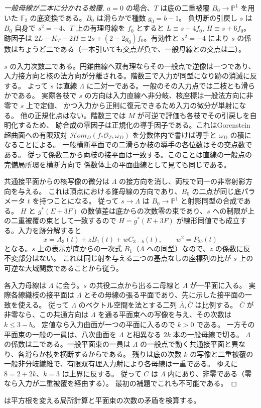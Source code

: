 \begin{proof}[一般母線が二本に分かれる被覆]
$a=0$ の場合、$T$ は底の二重被覆 $B_0\to\mathbb P^1$ を用いた
$\mathbb F_2$ の底変換である。$B_0$ は滑らかで種数 $g_0=b-1$。
負切断の引戻し $s$ は $B_0$ 自身で $s^2=-4$、$T$ 上の有理母線を $f_0$ とすると
$L\equiv s+4f_0$, $H\equiv s+6f_0$。
跡因子は $2L-K_T-2H\equiv2s+(2-2g_0)f_0$。有効性と $s^2=-4$ により
$s$ の係数はちょうど二である（一本引いても交点が負で、一般母線との交点は二）。

$s$ の入力次数二である。円錐曲線へ双有理ならその一般点で逆像は一つであり、
入力接方向と核の法方向が分離される。階数三で入力が同型になり跡の消滅に反する。
よって $s$ は直線 $\Lambda$ に二対一である。一般のその入力点では二枝とも滑らかである。
実際各枝で $s$ の方向は入力直線へ非分岐、核座標は一般法方向に非零で $s$ 上で定値、
かつ入力から正則に復元できるため入力の微分が単射になる。
他の正規化点はない。階数三では $M$ が可逆で評価も各枝でその引戻しを自明化するため、
跡合成の零因子は正規化の導手因子である。これはGorenstein超曲面への有限双対
$\mathcal Hom_D(f_*\mathcal O_T,\omega_D)$ を分数体内で書けば導手と $\omega_D$ の積になることによる。
一般横断平面での二滑らか枝の導手の各位数はその交点数である。
従って係数二から両枝の接平面は一致する。このことは直線の一般点の完備局所環を横断方向で
係数体上の平面曲線として見ても同じである。

共通接平面からの核写像の微分は $\Lambda$ の接方向を消し、両枝で同一の非零射影方向を与える。
これは頂点における錐母線の方向であり、$B_0$ の二点が同じ底パラメータ $t$ を持つことになる。
従って $s\to\Lambda$ は $B_0\to\mathbb P^1$ と射影同型の合成である。
$H$ と $g^*(E+3F)$ の数値差は底からの次数零の束であり、$s$ への制限が上の二重被覆の束として一致するので
$H=g^*(E+3F)$ が線形同値でも成立する。入力を跡分解すると
\[
          x=A_3(t)+z B_1(t)+ w C_{3-b}(t),\qquad w^2=P_{2b}(t)
\]
となる。$s$ 上の表示が底からの一次式 $B_1$（$\Lambda$ への同型）なので、$z$ の係数に反不変部分はない。
これは同じ射を与える二つの基点なしの座標列の比が $s$ 上の可逆な大域関数であることから従う。

各入力母線は $\Lambda$ に会う。$s$ の共役二点から出る二母線と $\Lambda$ が一平面に入る。
実際各線織枝の接平面は $\Lambda$ とその母線の張る平面であり、先に示した接平面の一致を使える。
従って $\Lambda$ のベクトル空間を法とする二列 $\bar A,\bar C$ は比例する。
$\bar C$ が非零なら、この共通方向は $\Lambda$ を通る平面束への写像を与え、その次数は $k\le3-b$。
定値なら入力曲面が一つの平面に入るので $k>0$ である。
一方その平面束の一般の一員は、八次曲面を $\Lambda$ と相異なる $2k$ 本の一般母線で切る。
$\Lambda$ の係数は二である。一般平面束の一員は $\Lambda$ の一般点で動く共通接平面と異なり、各滑らか枝を横断するからである。
残りは底の次数 $k$ の写像と二重被覆の一般非分岐繊維で、有限双有理入力射により各母線は一重である。
ゆえに $8=2+2k$、$k=3$ は上界に反する。
従って $C$ は $\Lambda$ 内にあり、非零である（零なら入力が二重被覆を経由する）。
最初の補題でこれも不可能である。
\end{proof}
 は平方根を変える局所計算と平面束の次数の矛盾を検算する。
